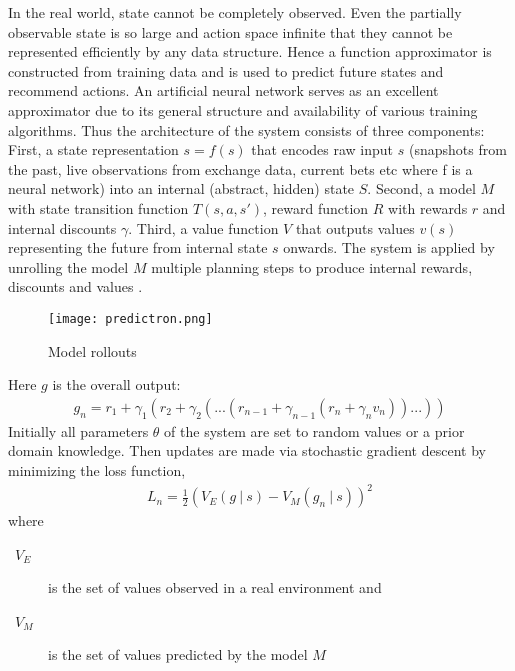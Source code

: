 \documentclass[a4paper]{article}
\begin{document}
In the real world, state cannot be completely observed. Even the partially observable state is so large and action space infinite that they cannot be represented efficiently by any data structure. Hence a function approximator is constructed from training data and is used to predict future states and recommend actions. An artificial neural network serves as an excellent approximator due to its general structure and availability of various training algorithms. Thus the architecture of the system consists of three components: First, a state representation $s=f(s)$ that encodes raw input $s$ (snapshots from the past, live observations from exchange data, current bets etc where f is a neural network) into an internal (abstract, hidden) state $S$. Second, a model $M$ with state transition function $T(s,a,s')$, reward function $R$ with rewards $r$ and internal discounts $\gamma$. Third, a value function $V$ that outputs values $v(s)$ representing the future from internal state $s$ onwards. The system is applied by unrolling the model $M$ multiple planning steps to produce internal rewards, discounts and values  \cite{Predictron}. 
\begin{figure}[h!] \centering
	\texttt{[image: predictron.png]}
	\caption{Model rollouts} \label{fig:predictron}
\end{figure}
Here $g$ is the overall output:
\begin{gather*}
g_n=r_1 + \gamma_1(r_2 + \gamma_2(...(r_{n-1} + \gamma_{n-1}(r_n + \gamma_nv_n))...))
\end{gather*}
Initially all parameters $\theta$ of the system are set to random values or a prior domain knowledge. Then updates are made via stochastic gradient descent by minimizing the loss function,
\begin{gather*}
L_n=\frac{1}{2}\left( V_E(g~|~s) - V_M(g_n~|~s) \right)^2
\end{gather*}
where
\begin{description}
	\item[~$V_E$] is the set of values observed in a real environment and
	\item[~$V_M$] is the set of values predicted by the model $M$
\end{description}
\end{document}

